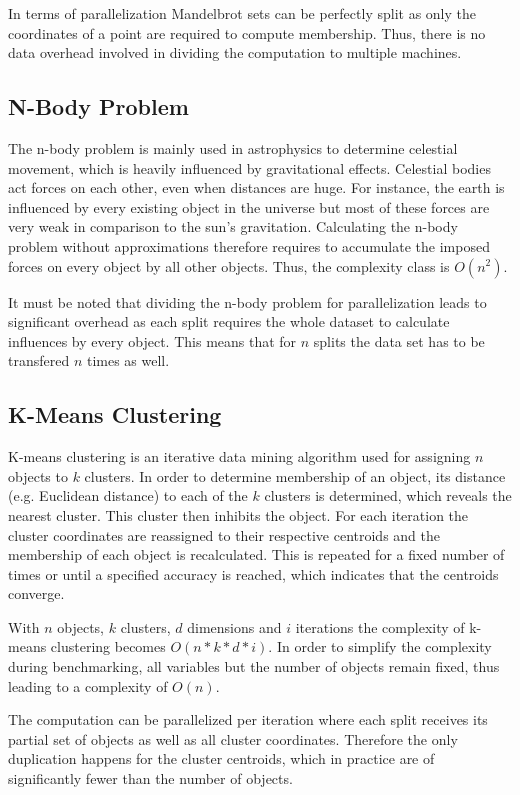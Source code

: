 In terms of parallelization Mandelbrot sets can be perfectly split as only the coordinates of a point are required to compute membership. Thus, there is no data overhead involved in dividing the computation to multiple machines.

\subsection*{N-Body Problem}

The n-body problem is mainly used in astrophysics to determine celestial movement, which is heavily influenced by gravitational effects. Celestial bodies act forces on each other, even when distances are huge. For instance, the earth is influenced by every existing object in the universe but most of these forces are very weak in comparison to the sun's gravitation. Calculating the n-body problem without approximations therefore requires to accumulate the imposed forces on every object by all other objects. Thus, the complexity class is $O(n^2)$.

It must be noted that dividing the n-body problem for parallelization leads to significant overhead as each split requires the whole dataset to calculate influences by every object. This means that for $n$ splits the data set has to be transfered $n$ times as well.

\subsection*{K-Means Clustering}

K-means clustering is an iterative data mining algorithm used for assigning $n$ objects to $k$ clusters. In order to determine membership of an object, its distance (e.g. Euclidean distance) to each of the $k$ clusters is determined, which reveals the nearest cluster. This cluster then inhibits the object. For each iteration the cluster coordinates are reassigned to their respective centroids and the membership of each object is recalculated. This is repeated for a fixed number of times or until a specified accuracy is reached, which indicates that the centroids converge.

With $n$ objects, $k$ clusters, $d$ dimensions and $i$ iterations the complexity of k-means clustering becomes $O(n*k*d*i)$. In order to simplify the complexity during benchmarking, all variables but the number of objects remain fixed, thus leading to a complexity of $O(n)$.

The computation can be parallelized per iteration where each split receives its partial set of objects as well as all cluster coordinates. Therefore the only duplication happens for the cluster centroids, which in practice are of significantly fewer than the number of objects.
